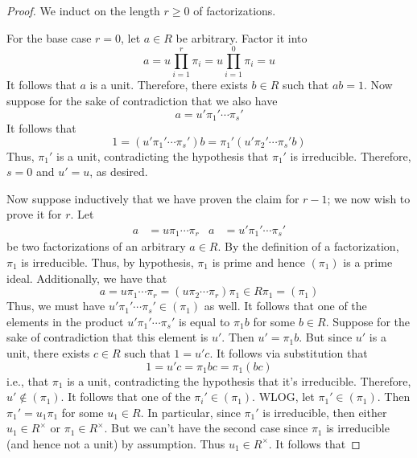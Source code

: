 \documentclass[../notes.tex]{subfiles}
\begin{document}
\begin{itemize}
\begin{proof}
        We induct on the length $r\geq 0$ of factorizations.\par
        For the base case $r=0$, let $a\in R$ be arbitrary. Factor it into
        \begin{equation*}
            a = u\prod_{i=1}^r\pi_i
            = u\prod_{i=1}^0\pi_i
            = u
        \end{equation*}
        It follows that $a$ is a unit. Therefore, there exists $b\in R$ such that $ab=1$. Now suppose for the sake of contradiction that we also have
        \begin{equation*}
            a = u'\pi_1'\cdots\pi_s'
        \end{equation*}
        It follows that
        \begin{equation*}
            1 = (u'\pi_1'\cdots\pi_s')b
            = \pi_1'(u'\pi_2'\cdots\pi_s'b)
        \end{equation*}
        Thus, $\pi_1'$ is a unit, contradicting the hypothesis that $\pi_1'$ is irreducible. Therefore, $s=0$ and $u'=u$, as desired.\par
        Now suppose inductively that we have proven the claim for $r-1$; we now wish to prove it for $r$. Let
        \begin{align*}
            a &= u\pi_1\cdots\pi_r&
            a &= u'\pi_1'\cdots\pi_s'
        \end{align*}
        be two factorizations of an arbitrary $a\in R$. By the definition of a factorization, $\pi_1$ is irreducible. Thus, by hypothesis, $\pi_1$ is prime and hence $(\pi_1)$ is a prime ideal. Additionally, we have that
        \begin{equation*}
            a = u\pi_1\cdots\pi_r
            = (u\pi_2\cdots\pi_r)\pi_1
            \in R\pi_1
            = (\pi_1)
        \end{equation*}
        Thus, we must have $u'\pi_1'\cdots\pi_s'\in(\pi_1)$ as well. It follows that one of the elements in the product $u'\pi_1'\cdots\pi_s'$ is equal to $\pi_1b$ for some $b\in R$. Suppose for the sake of contradiction that this element is $u'$. Then $u'=\pi_1b$. But since $u'$ is a unit, there exists $c\in R$ such that $1=u'c$. It follows via substitution that
        \begin{equation*}
            1 = u'c
            = \pi_1bc
            = \pi_1(bc)
        \end{equation*}
        i.e., that $\pi_1$ is a unit, contradicting the hypothesis that it's irreducible. Therefore, $u'\notin(\pi_1)$. It follows that one of the $\pi_i'\in(\pi_1)$. WLOG, let $\pi_1'\in(\pi_1)$. Then $\pi_1'=u_1\pi_1$ for some $u_1\in R$. In particular, since $\pi_1'$ is irreducible, then either $u_1\in R^\times$ or $\pi_1\in R^\times$. But we can't have the second case since $\pi_1$ is irreducible (and hence not a unit) by assumption. Thus $u_1\in R^\times$. It follows that

\end{proof}
\end{itemize}
\end{document}

